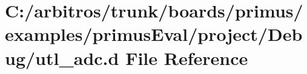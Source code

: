 \hypertarget{boards_2primus_2examples_2primus_eval_2project_2_debug_2utl__adc_8d}{\section{C\-:/arbitros/trunk/boards/primus/examples/primus\-Eval/project/\-Debug/utl\-\_\-adc.d File Reference}
\label{boards_2primus_2examples_2primus_eval_2project_2_debug_2utl__adc_8d}
}
